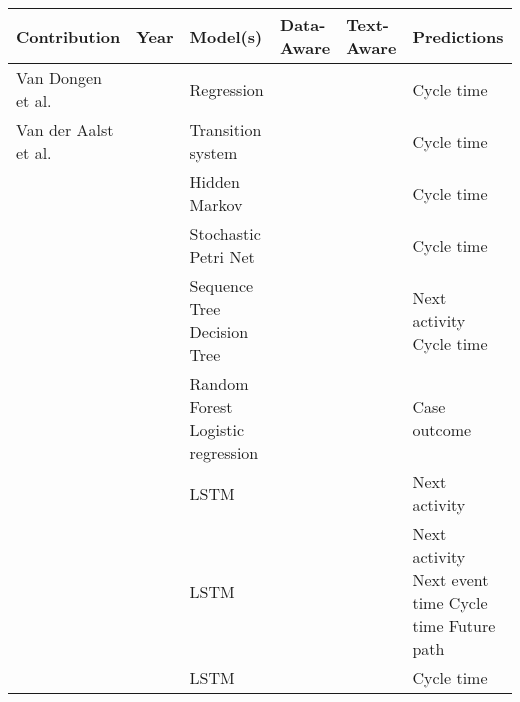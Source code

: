 \begin{table}[]
	\renewcommand{\arraystretch}{1.5}
	\begin{tabularx}{\textwidth}{
			>{\hsize=2.0\hsize}X
			>{\hsize=0.4\hsize}X
			>{\hsize=1.3\hsize}X
			>{\hsize=0.5\hsize}X
			>{\hsize=0.5\hsize}X
			>{\hsize=1.3\hsize}X
		}
		\toprule
		\textbf{Contribution} & \textbf{Year} & \textbf{Model(s)}  & \textbf{Data-Aware} &  \textbf{Text-Aware} & \textbf{Predictions} \\ \midrule
		 Van Dongen et al. \cite{DBLP:conf/otm/DongenCA08}& \citeyear{DBLP:conf/otm/DongenCA08} & Regression  & \checkmark & \xmark& Cycle time\\
		 
		 Van der Aalst et al. \cite{DBLP:journals/is/AalstSS11}&  \citeyear{DBLP:journals/is/AalstSS11}& Transition system  
		   & \xmark & \xmark & Cycle time \\   
		   
		 \citeauthor{DBLP:conf/colcom/PandeyNC11} \cite{DBLP:conf/colcom/PandeyNC11} & \citeyear{DBLP:conf/colcom/PandeyNC11} & Hidden Markov & \xmark & \xmark & Cycle time \\
		 
		 \citeauthor{DBLP:conf/icsoc/Rogge-SoltiW13} \cite{DBLP:conf/icsoc/Rogge-SoltiW13} & \citeyear{DBLP:conf/icsoc/Rogge-SoltiW13} &Stochastic Petri Net & \xmark & \xmark & Cycle time\\
		 
		 \citeauthor{DBLP:conf/dis/CeciLFCM14} \cite{DBLP:conf/dis/CeciLFCM14} & \citeyear{DBLP:conf/dis/CeciLFCM14} & Sequence Tree \newline Decision Tree& \checkmark & \xmark & Next activity \newline Cycle time \\
		 
		 \citeauthor{DBLP:conf/bpm/TeinemaaDMF16}  \cite{DBLP:conf/bpm/TeinemaaDMF16} &  \citeyear{DBLP:conf/bpm/TeinemaaDMF16} & Random Forest \newline Logistic regression & \checkmark & \checkmark & Case outcome \\
		 
		 \citeauthor{ DBLP:conf/bpm/EvermannRF16} \cite{ DBLP:conf/bpm/EvermannRF16} &  \citeyear{ DBLP:conf/bpm/EvermannRF16}& LSTM & \xmark & \xmark & Next activity \\
		 
		 \citeauthor{DBLP:conf/caise/TaxVRD17} \cite{DBLP:conf/caise/TaxVRD17} & \citeyear{DBLP:conf/caise/TaxVRD17} & LSTM & \xmark & \xmark & Next activity \newline Next event time \newline Cycle time \newline Future path \\
		 \citeauthor{DBLP:conf/ssci/NavarinVPS17} \cite{DBLP:conf/ssci/NavarinVPS17} &  \citeyear{DBLP:conf/ssci/NavarinVPS17}&  LSTM & \checkmark  & \xmark & Cycle time\\
		 

\end{tabularx}
\end{table}
